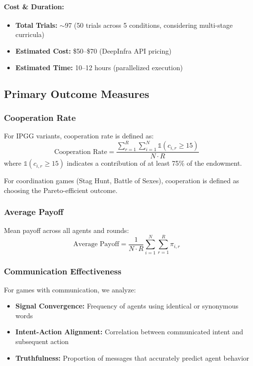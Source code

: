 \paragraph{Cost \& Duration:}
\begin{itemize}
    \item \textbf{Total Trials:} $\sim$97 (50 trials across 5 conditions, considering multi-stage curricula)
    \item \textbf{Estimated Cost:} \$50--\$70 (DeepInfra API pricing)
    \item \textbf{Estimated Time:} 10--12 hours (parallelized execution)
\end{itemize}


\subsection{Primary Outcome Measures}

\subsubsection{Cooperation Rate}

For IPGG variants, cooperation rate is defined as:
\[
\text{Cooperation Rate} = \frac{\sum_{r=1}^{R} \sum_{i=1}^{N} \mathbb{1}(c_{i,r} \geq 15)}{N \cdot R}
\]
where $\mathbb{1}(c_{i,r} \geq 15)$ indicates a contribution of at least 75\% of the endowment.

For coordination games (Stag Hunt, Battle of Sexes), cooperation is defined as choosing the Pareto-efficient outcome.

\subsubsection{Average Payoff}

Mean payoff across all agents and rounds:
\[
\text{Average Payoff} = \frac{1}{N \cdot R} \sum_{i=1}^{N} \sum_{r=1}^{R} \pi_{i,r}
\]

\subsubsection{Communication Effectiveness}

For games with communication, we analyze:
\begin{itemize}
    \item \textbf{Signal Convergence:} Frequency of agents using identical or synonymous words
    \item \textbf{Intent-Action Alignment:} Correlation between communicated intent and subsequent action
    \item \textbf{Truthfulness:} Proportion of messages that accurately predict agent behavior
\end{itemize}

